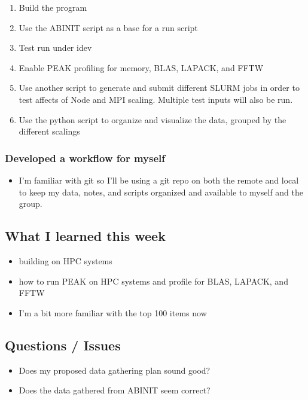 \documentclass[
]{article}
\providecommand{\tightlist}{%
  \setlength{\itemsep}{0pt}\setlength{\parskip}{0pt}}
\begin{document}
\begin{enumerate}
\def\labelenumi{\arabic{enumi}.}
\tightlist
\item
  Build the program
\item
  Use the ABINIT script as a base for a run script
\item
  Test run under idev
\item
  Enable PEAK profiling for memory, BLAS, LAPACK, and FFTW
\item
  Use another script to generate and submit different SLURM jobs in
  order to test affects of Node and MPI scaling. Multiple test inputs
  will also be run.
\item
  Use the python script to organize and visualize the data, grouped by
  the different scalings
\end{enumerate}

\subsubsection{Developed a workflow for
myself}\label{developed-a-workflow-for-myself}

\begin{itemize}
\tightlist
\item
  I'm familiar with git so I'll be using a git repo on both the remote
  and local to keep my data, notes, and scripts organized and available
  to myself and the group.
\end{itemize}

\subsection{What I learned this week}\label{what-i-learned-this-week}

\begin{itemize}
\tightlist
\item
  building on HPC systems
\item
  how to run PEAK on HPC systems and profile for BLAS, LAPACK, and FFTW
\item
  I'm a bit more familiar with the top 100 items now
\end{itemize}

\subsection{Questions / Issues}\label{questions-issues}

\begin{itemize}
\tightlist
\item
  Does my proposed data gathering plan sound good?
\item
  Does the data gathered from ABINIT seem correct?
\end{itemize}
\end{document}
